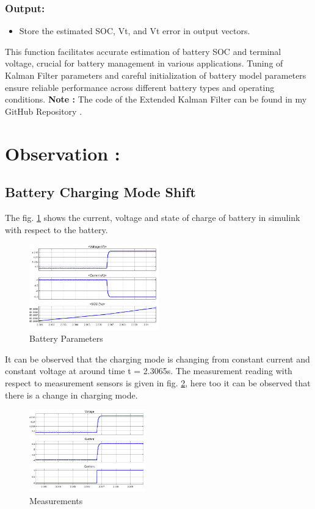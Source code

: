 \documentclass[conference]{IEEEtran}
\begin{document}
\subsubsection{Output:}
\begin{itemize}
  \item Store the estimated SOC, Vt, and Vt error in output vectors.
\end{itemize}

This function facilitates accurate estimation of battery SOC and terminal voltage, crucial for battery management in various applications. Tuning of Kalman Filter parameters and careful initialization of battery model parameters ensure reliable performance across different battery types and operating conditions.\newline
\textbf{Note :} The code of the Extended Kalman Filter can be found in my GitHub Repository \cite{github_repo}.

\section{Observation :}
\subsection{Battery Charging Mode Shift}
\hspace{0.5cm}The fig. \ref{battery_parameters} shows the current, voltage and state of charge of battery in simulink with respect to the battery.\newline
\begin{figure}[htbp]
    \centering
    \includegraphics[width=0.5\textwidth]{images/battery_params.jpeg}
    \caption{Battery Parameters}
    \label{battery_parameters}
\end{figure}
\hspace{0.5cm} It can be observed that the charging mode is changing from constant current and constant voltage at around time t = 2.3065s. The measurement reading with respect to measurement sensors is given in fig. \ref{measurement_block}, here too it can be observed that there is a change in charging mode.
\begin{figure}[htbp]
    \centering
    \includegraphics[width=0.45\textwidth]{images/measurement_block.jpeg}
    \caption{Measurements}
    \label{measurement_block}
\end{figure}
\end{document}
